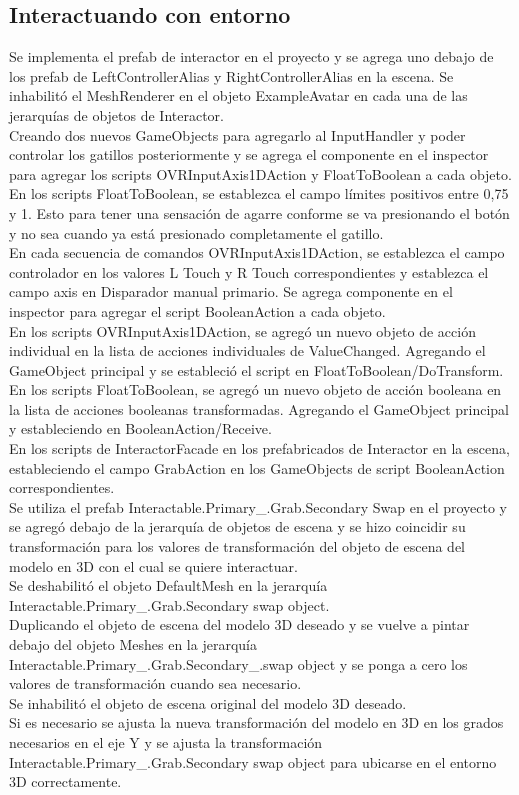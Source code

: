 \subsection{Interactuando con entorno}
Se implementa el prefab de interactor en el proyecto y se agrega uno debajo de los prefab de LeftControllerAlias y RightControllerAlias en la escena.
Se inhabilitó el MeshRenderer en el objeto ExampleAvatar en cada una de las jerarquías de objetos de Interactor.\\
Creando dos nuevos GameObjects para agregarlo al InputHandler y poder controlar los gatillos posteriormente y se agrega el componente en el inspector para agregar los scripts
OVRInputAxis1DAction y FloatToBoolean a cada objeto.\\
En los scripts FloatToBoolean, se establezca el campo límites positivos entre 0,75 y 1. Esto para tener una sensación de agarre conforme se va presionando el botón y no sea 
cuando ya está presionado completamente el gatillo.\\
En cada secuencia de comandos OVRInputAxis1DAction, se establezca el campo controlador en los valores L Touch y R Touch correspondientes y establezca el campo axis en 
Disparador manual primario. Se agrega componente en el inspector para agregar el script BooleanAction a cada objeto.\\
En los scripts OVRInputAxis1DAction, se agregó un nuevo objeto de acción individual en la lista de acciones individuales de ValueChanged. Agregando el GameObject principal 
y se estableció el script en FloatToBoolean/DoTransform.\\
En los scripts FloatToBoolean, se agregó un nuevo objeto de acción booleana en la lista de acciones booleanas transformadas. Agregando el GameObject principal y estableciendo 
en BooleanAction/Receive.\\
En los scripts de InteractorFacade en los prefabricados de Interactor en la escena, estableciendo el campo GrabAction en los GameObjects de script BooleanAction correspondientes.\\
Se utiliza el prefab Interactable.Primary\_.Grab.Secondary Swap en el proyecto y se agregó debajo de la jerarquía de objetos de escena y se hizo coincidir su transformación para 
los valores de transformación del objeto de escena del modelo en 3D con el cual se quiere interactuar.\\
Se deshabilitó el objeto DefaultMesh en la jerarquía Interactable.Primary\_.Grab.Secondary swap object.\\
Duplicando el objeto de escena del modelo 3D deseado y  se vuelve a pintar debajo del objeto Meshes en la jerarquía Interactable.Primary\_.Grab.Secondary\_.swap object y 
se ponga a cero los valores de transformación cuando sea necesario.\\
Se inhabilitó el objeto de escena original del modelo 3D deseado.\\
Si es necesario se ajusta la nueva transformación del modelo en 3D en los grados necesarios en el eje Y y se ajusta la transformación Interactable.Primary\_.Grab.Secondary 
swap object para ubicarse en el entorno 3D correctamente.\\

